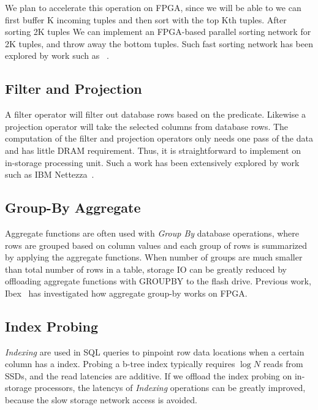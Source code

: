 \documentclass{article}
\newcommand{\indexing}{\textit{Indexing}\xspace}
\newcommand{\groupby}{\textit{Group By}\xspace}
\begin{document}
We plan to accelerate this operation on FPGA, since we will be able to we can first buffer K incoming tuples and then sort with the top Kth tuples.
After sorting 2K tuples
We can implement an FPGA-based parallel sorting network for 2K tuples, and throw away the bottom tuples.
Such fast sorting network has been explored by work such as ~\cite{fpga-sort}.

\subsection{Filter and Projection}

A filter operator will filter out database rows based on the predicate.
Likewise a projection operator will take the selected columns from database rows.
The computation of the filter and projection operators only needs one pass of the data and has little DRAM requirement.
Thus, it is straightforward to implement on in-storage processing unit.
Such a work has been extensively explored by work such as IBM Nettezza~\cite{netezza}.

\subsection{Group-By Aggregate}

Aggregate functions are often used with \groupby database operations, where rows are grouped based on column values and each group of rows is summarized by applying the aggregate functions.
When number of groups are much smaller than total number of rows in a table, storage IO can be greatly reduced by offloading aggregate functions with GROUPBY to the flash drive.
Previous work, Ibex~\cite{ibex} has investigated how aggregate group-by works on FPGA.

\subsection{Index Probing}
\label{sec:index}
\indexing are used in SQL queries to pinpoint row data locations when a certain column has a index.
Probing a b-tree index typically requires $\log{N}$ reads from SSDs, and the read latencies are additive.
If we offload  the index probing on in-storage processors, the latencys of \indexing operations can be greatly improved, because the slow storage network access is avoided.




\end{document}
